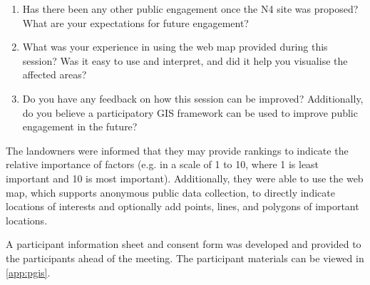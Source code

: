 \begin{enumerate}[noitemsep]
  \item Has there been any other public engagement once the N4 site was proposed? What are your expectations for future engagement?
  \item What was your experience in using the web map provided during this session? Was it easy to use and interpret, and did it help you visualise the affected areas?
  \item Do you have any feedback on how this session can be improved? Additionally, do you believe a participatory GIS framework can be used to improve public engagement in the future?
\end{enumerate}

The landowners were informed that they may provide rankings to indicate the relative importance of factors (e.g. in a scale of 1 to 10, where 1 is least important and 10 is most important). Additionally, they were able to use the web map, which supports anonymous public data collection, to directly indicate locations of interests and optionally add points, lines, and polygons of important locations.

A participant information sheet and consent form was developed and provided to the participants ahead of the meeting. The participant materials can be viewed in \autoref{app:pgis}.

